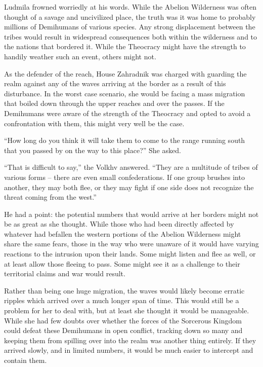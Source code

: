  

Ludmila frowned worriedly at his words. While the Abelion Wilderness was often thought of a savage and uncivilized place, the truth was it was home to probably millions of Demihumans of various species. Any strong displacement between the tribes would result in widespread consequences both within the wilderness and to the nations that bordered it. While the Theocracy might have the strength to handily weather such an event, others might not.

 

As the defender of the reach, House Zahradnik was charged with guarding the realm against any of the waves arriving at the border as a result of this disturbance. In the worst case scenario, she would be facing a mass migration that boiled down through the upper reaches and over the passes. If the Demihumans were aware of the strength of the Theocracy and opted to avoid a confrontation with them, this might very well be the case.

 

“How long do you think it will take them to come to the range running south that you passed by on the way to this place?” She asked.

 

“That is difficult to say,” the Volkhv answered. “They are a multitude of tribes of various forms – there are even small confederations. If one group brushes into another, they may both flee, or they may fight if one side does not recognize the threat coming from the west.”

 

He had a point: the potential numbers that would arrive at her borders might not be as great as she thought. While those who had been directly affected by whatever had befallen the western portions of the Abelion Wilderness might share the same fears, those in the way who were unaware of it would have varying reactions to the intrusion upon their lands. Some might listen and flee as well, or at least allow those fleeing to pass. Some might see it as a challenge to their territorial claims and war would result.

 

Rather than being one huge migration, the waves would likely become erratic ripples which arrived over a much longer span of time. This would still be a problem for her to deal with, but at least she thought it would be manageable. While she had few doubts over whether the forces of the Sorcerous Kingdom could defeat these Demihumans in open conflict, tracking down so many and keeping them from spilling over into the realm was another thing entirely. If they arrived slowly, and in limited numbers, it would be much easier to intercept and contain them.


